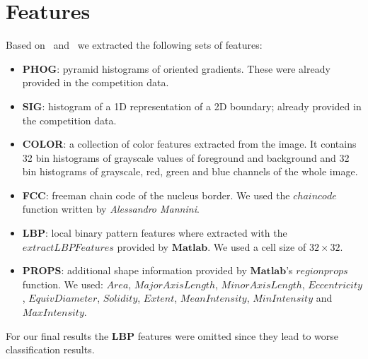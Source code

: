 \documentclass[a4paper, 11pt]{article}
\begin{document}
\section{Features}

Based on~\cite{SchuefflerDAGM2010} and~\cite{schueffler2011} we extracted
the following sets of features:

\begin{itemize}
    \item \textbf{PHOG}: pyramid histograms of oriented gradients. These were
        already provided in the competition data.
    \item \textbf{SIG}: histogram of a 1D representation of a 2D boundary; already
        provided in the competition data.
    \item \textbf{COLOR}: a collection of color features extracted from the image.
        It contains 32 bin histograms of grayscale values of foreground and background and
        32 bin histograms of grayscale, red, green and blue channels of the whole image.
    \item \textbf{FCC}: freeman chain code of the nucleus border. We used the 
        $chaincode$ function written by \textit{Alessandro Mannini}.
    \item \textbf{LBP}: local binary pattern features where extracted with the
        $extractLBPFeatures$ provided by $\mathbf{Matlab}$. We used a cell size
        of $32 \times 32$.
    \item \textbf{PROPS}: additional shape information provided by $\mathbf{Matlab}$'s
        $regionprops$ function. We used: $Area$, $MajorAxisLength$, $MinorAxisLength$,
        $Eccentricity$, $EquivDiameter$, $Solidity$, $Extent$, $MeanIntensity$,
        $MinIntensity$ and $MaxIntensity$.
\end{itemize}

For our final results the \textbf{LBP} features were omitted since they lead
to worse classification results.



{}

\end{document}
